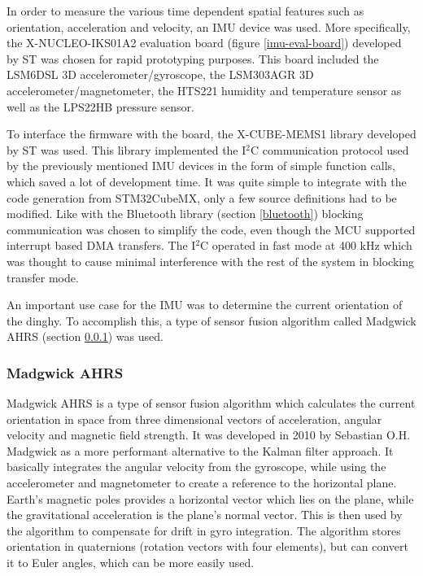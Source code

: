 In order to measure the various time dependent spatial features such as orientation, acceleration and velocity, an IMU device was used. More specifically, the X-NUCLEO-IKS01A2 \cite{x-nucleo-iks01a2} evaluation board (figure \ref{imu-eval-board}) developed by ST was chosen for rapid prototyping purposes. This board included the LSM6DSL 3D accelerometer/gyroscope, the LSM303AGR 3D accelerometer/magnetometer, the HTS221 humidity and temperature sensor as well as the LPS22HB pressure sensor.

To interface the firmware with the board, the X-CUBE-MEMS1 \cite{x-cube-mems1} library developed by ST was used. This library implemented the I$^2$C communication protocol used by the previously mentioned IMU devices in the form of simple function calls, which saved a lot of development time. It was quite simple to integrate with the code generation from STM32CubeMX, only a few source definitions had to be modified. Like with the Bluetooth library (section \ref{bluetooth}) blocking communication was chosen to simplify the code, even though the MCU supported interrupt based DMA transfers. The I$^2$C operated in fast mode at 400 kHz which was thought to cause minimal interference with the rest of the system in blocking transfer mode.

An important use case for the IMU was to determine the current orientation of the dinghy. To accomplish this, a type of sensor fusion algorithm called Madgwick AHRS (section \ref{madgwick}) was used.

\subsubsection{Madgwick AHRS}
\label{madgwick}
Madgwick AHRS \cite{madgwick} is a type of sensor fusion algorithm which calculates the current orientation in space from three dimensional vectors of acceleration, angular velocity and magnetic field strength. It was developed in 2010 by Sebastian O.H. Madgwick as a more performant alternative to the Kalman filter approach. It basically integrates the angular velocity from the gyroscope, while using the accelerometer and magnetometer to create a reference to the horizontal plane. Earth’s magnetic poles provides a horizontal vector which lies on the plane, while the gravitational acceleration is the plane’s normal vector. This is then used by the algorithm to compensate for drift in gyro integration. The algorithm stores orientation in quaternions (rotation vectors with four elements), but can convert it to Euler angles, which can be more easily used.

